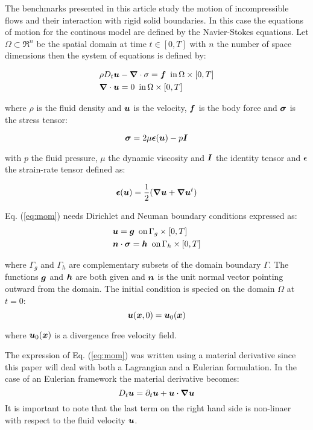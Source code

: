 The benchmarks presented in this article study the motion of incompressible flows and their interaction with rigid solid boundaries. In this case the equations of motion for the continous model are defined by the Navier-Stokes equations. Let $\Omega\subset \Re^n$ be the spatial domain at time $t\in[0,T]$ with $n$ the number of space dimensions then the system of equations is defined by:


\begin{eqnarray}
&\rho D_t\boldsymbol{u}-\boldsymbol{\nabla}\cdot\sigma=\boldsymbol{f} \,\,\, \text{in}\, \Omega\times[0,T] \label{eq:mom}\\
&\boldsymbol{\nabla}\cdot \boldsymbol{u}=0 \label{eq:cont} \,\,\, \text{in}\, \Omega\times[0,T] 
\end{eqnarray}

where $\rho$ is the fluid density and $\boldsymbol{u}$ is the velocity, $\boldsymbol{f}$ is the body force and $\boldsymbol{\sigma}$ is the stress tensor:

\begin{equation}
\boldsymbol{\sigma}=2\mu\boldsymbol{\epsilon}(\boldsymbol{u})-p\boldsymbol{I}
\end{equation}

with $p$ the fluid pressure, $\mu$ the dynamic viscosity and $\boldsymbol{I}$ the identity tensor and $\boldsymbol{\epsilon}$ the strain-rate tensor defined as:

\begin{equation}
  \boldsymbol{\epsilon}(\boldsymbol{u})=\frac{1}{2}(\boldsymbol{\nabla}\boldsymbol{u}+\boldsymbol{\nabla}\boldsymbol{u}^t)
\end{equation}

Eq. (\ref{eq:mom}) needs Dirichlet and Neuman boundary conditions expressed as:
\begin{eqnarray}
  &\boldsymbol{u}=\boldsymbol{g} \,\,\, \text{on}\, \Gamma_g\times[0,T]\\   
  &\boldsymbol{n}\cdot\boldsymbol{\sigma}=\boldsymbol{h} \,\,\, \text{on}\, \Gamma_h\times[0,T]
\end{eqnarray}

where $\Gamma_g$ and $\Gamma_h$ are complementary subsets of the domain boundary $\Gamma$. The functions $\boldsymbol{g}$ and $\boldsymbol{h}$ are both given and $\boldsymbol{n}$ is the unit normal vector pointing outward from the domain.
The initial condition is specied on the domain $\Omega$ at $t=0$:
\begin{equation}
  \boldsymbol{u}(\boldsymbol{x},0)=\boldsymbol{u}_0(\boldsymbol{x})
\end{equation}

where $\boldsymbol{u}_0(\boldsymbol{x})$ is a divergence free velocity field.

The expression of Eq. (\ref{eq:mom}) was written using a material derivative since this paper will deal with both a Lagrangian and a Eulerian formulation. In the case of an Eulerian framework the material derivative becomes:
\begin{equation}
D_t\boldsymbol{u}=\partial_t\boldsymbol{u}+\boldsymbol{u} \cdot \boldsymbol{\nabla}\boldsymbol{u}  
\end{equation}
It is important to note that the last term on the right hand side is non-linaer with respect to the fluid velocity $\boldsymbol{u}$.
